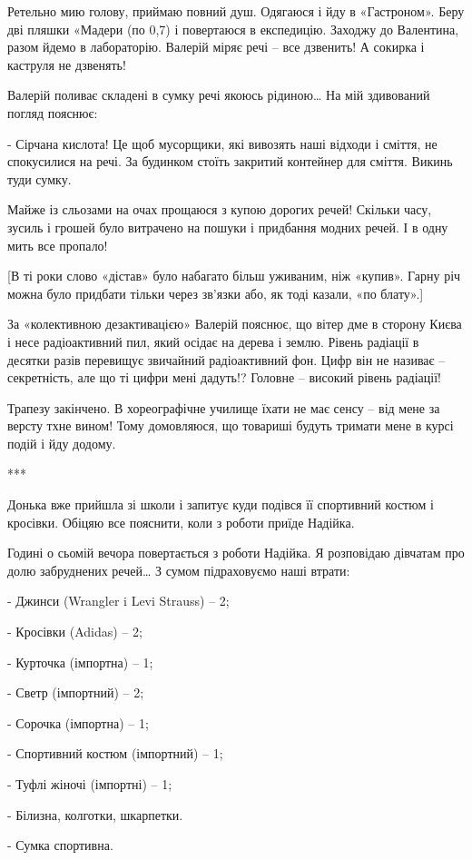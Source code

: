 Ретельно мию голову, приймаю повний душ. Одягаюся і йду в «Гастроном». Беру дві
пляшки «Мадери (по 0,7) і повертаюся в експедицію. Заходжу до Валентина, разом
йдемо в лабораторію. Валерій міряє речі – все дзвенить! А сокирка і каструля не
дзвенять!

Валерій поливає складені в сумку речі якоюсь рідиною… На мій здивований погляд
пояснює:

- Сірчана кислота! Це щоб мусорщики, які вивозять наші відходи і сміття, не
спокусилися на речі. За будинком стоїть закритий контейнер для сміття. Викинь
туди сумку.

Майже із сльозами на очах прощаюся з купою дорогих речей! Скільки часу, зусиль
і грошей було витрачено на пошуки і придбання модних речей. І в одну мить все
пропало! 

[В ті роки слово «дістав» було набагато більш уживаним, ніж «купив». Гарну річ
можна було придбати тільки через зв’язки або, як тоді казали, «по блату».]

За «колективною дезактивацією» Валерій пояснює, що вітер дме в сторону Києва і
несе радіоактивний пил, який осідає на дерева і землю. Рівень радіації в
десятки разів перевищує звичайний радіоактивний фон. Цифр він не називає –
секретність, але що ті цифри мені дадуть!? Головне – високий рівень радіації!

Трапезу закінчено. В хореографічне училище їхати не має сенсу – від мене за
версту тхне вином! Тому домовляюся, що товариші будуть тримати мене в курсі
подій і йду додому. 

***

Донька вже прийшла зі школи і запитує куди подівся її спортивний костюм і
кросівки. Обіцяю все пояснити, коли з роботи приїде Надійка. 

Годині о сьомій вечора повертається з роботи Надійка. Я розповідаю дівчатам про
долю забруднених речей… З сумом підраховуємо наші втрати:

- Джинси (Wrangler i Levi Strauss) – 2;

- Кросівки (Adidas) – 2;

- Курточка (імпортна) – 1;

- Светр (імпортний) – 2;

- Сорочка (імпортна) – 1;

- Спортивний костюм (імпортний) – 1;

- Туфлі жіночі (імпортні) – 1;

- Білизна, колготки, шкарпетки.

- Сумка спортивна.

